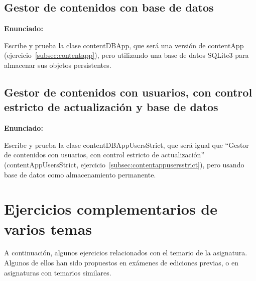\subsection{Gestor de contenidos con base de datos}
\label{subsec:gestor-contenidos-bbdd}

\textbf{Enunciado:}

Escribe y prueba la clase contentDBApp, que será una versión de contentApp (ejercicio~\ref{subsec:contentapp}), pero utilizando una base de datos SQLite3 para almacenar sus objetos persistentes.

\subsection{Gestor de contenidos con usuarios, con control estricto de actualización y base de datos}
\label{subsec:gestor-contenidos-usuarios-bbdd}

\textbf{Enunciado:}

Escribe y prueba la clase contentDBAppUsersStrict, que será igual que ``Gestor de contenidos con usuarios, con control estricto de actualización'' (contentAppUsersStrict, ejercicio~\ref{subsec:contentappusersstrict}), pero usando base de datos como almacenamiento permanente.

\newpage




\section{Ejercicios complementarios de varios temas}

A continuación, algunos ejercicios relacionados con el temario de la asignatura. Algunos de ellos han sido propuestos en exámenes de ediciones previas, o en asignaturas con temarios similares.

